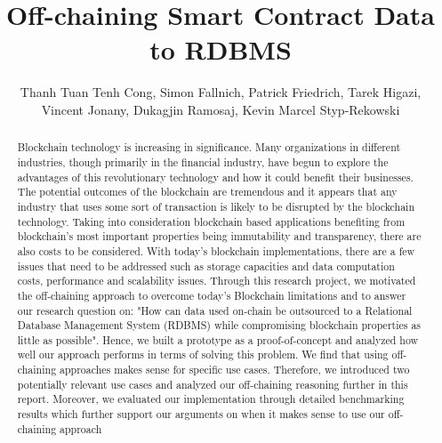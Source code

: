 \documentclass[a4paper]{article}
\title{Off-chaining Smart Contract Data to RDBMS}
\author{Thanh Tuan Tenh Cong, 
Simon Fallnich,
Patrick Friedrich,
Tarek Higazi,\\
Vincent Jonany,
Dukagjin Ramosaj,
Kevin Marcel Styp-Rekowski}
\begin{document}
\maketitle

\begin{abstract}

Blockchain technology is increasing in significance. Many organizations in different industries, though primarily in the financial industry, have begun to explore the advantages of this revolutionary technology and how it could benefit their businesses. The potential outcomes of the blockchain are tremendous and it appears that any industry that uses some sort of transaction is likely to be disrupted by the blockchain technology. Taking into consideration blockchain based applications benefiting from blockchain's most important properties being immutability and transparency, there are also costs to be considered. With today's blockchain implementations, there are a few issues that need to be addressed such as storage capacities and data computation costs, performance and scalability issues. Through this research project, we motivated the off-chaining approach to overcome today's Blockchain limitations and to answer our research question on: "How can data used on-chain be outsourced to a Relational Database Management System (RDBMS) while compromising blockchain properties as little as possible". Hence, we built a prototype as a proof-of-concept and analyzed how well our approach performs in terms of solving this problem. We find that using off-chaining approaches makes sense for specific use cases. Therefore, we introduced two potentially relevant use cases and analyzed our off-chaining reasoning further in this report. Moreover, we evaluated our implementation through detailed benchmarking results which further support our arguments on when it makes sense to use our off-chaining approach


\end{abstract}
\newpage
\tableofcontents
\newpage











\newpage


\end{document}
